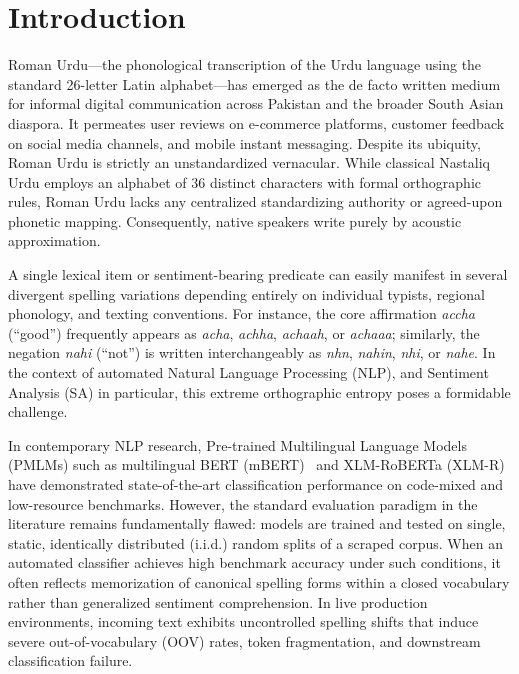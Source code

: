\section{Introduction}
\label{sec:introduction}

Roman Urdu---the phonological transcription of the Urdu language using the standard 26-letter Latin alphabet---has emerged as the de facto written medium for informal digital communication across Pakistan and the broader South Asian diaspora. It permeates user reviews on e-commerce platforms, customer feedback on social media channels, and mobile instant messaging. Despite its ubiquity, Roman Urdu is strictly an unstandardized vernacular. While classical Nastaliq Urdu employs an alphabet of 36 distinct characters with formal orthographic rules, Roman Urdu lacks any centralized standardizing authority or agreed-upon phonetic mapping. Consequently, native speakers write purely by acoustic approximation. 

A single lexical item or sentiment-bearing predicate can easily manifest in several divergent spelling variations depending entirely on individual typists, regional phonology, and texting conventions. For instance, the core affirmation \textit{accha} (``good'') frequently appears as \textit{acha}, \textit{achha}, \textit{achaah}, or \textit{achaaa}; similarly, the negation \textit{nahi} (``not'') is written interchangeably as \textit{nhn}, \textit{nahin}, \textit{nhi}, or \textit{nahe}. In the context of automated Natural Language Processing (NLP), and Sentiment Analysis (SA) in particular, this extreme orthographic entropy poses a formidable challenge.

In contemporary NLP research, Pre-trained Multilingual Language Models (PMLMs) such as multilingual BERT (\mbox{mBERT})~\cite{devlin2019bert} and XLM-RoBERTa (\mbox{XLM-R})~\cite{conneau2020unsupervised} have demonstrated state-of-the-art classification performance on code-mixed and low-resource benchmarks. However, the standard evaluation paradigm in the literature remains fundamentally flawed: models are trained and tested on single, static, identically distributed (i.i.d.) random splits of a scraped corpus. When an automated classifier achieves high benchmark accuracy under such conditions, it often reflects memorization of canonical spelling forms within a closed vocabulary rather than generalized sentiment comprehension. In live production environments, incoming text exhibits uncontrolled spelling shifts that induce severe out-of-vocabulary (OOV) rates, token fragmentation, and downstream classification failure.

